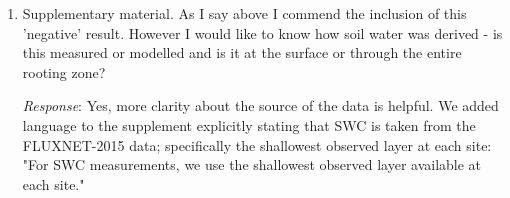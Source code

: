 \documentclass[12pt]{article}
\begin{document}
\begin{enumerate}
\item Supplementary material. As I say above I commend the inclusion of
  this 'negative' result.  However I would like to know how soil
  water was derived - is this measured or modelled and is it at the
  surface or through the entire rooting zone?

\textit{Response}: Yes, more clarity about the source of the data is
    helpful. We added language to the supplement explicitly stating that
    SWC is taken from the FLUXNET-2015 data; specifically the shallowest
    observed layer at each site: "For SWC measurements, we use the
    shallowest observed layer available at each site."
\end{enumerate}
\end{document}
